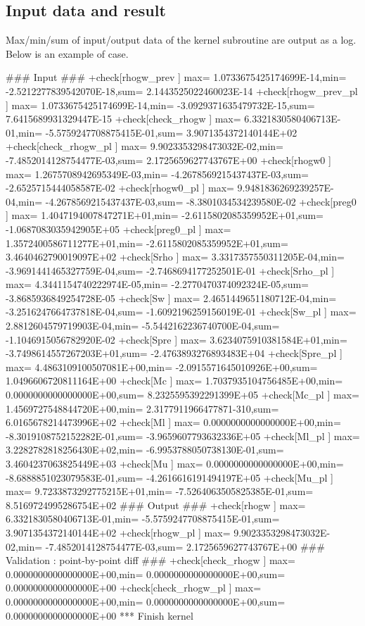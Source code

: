 \subsection{Input data and result}

Max/min/sum of input/output data of the kernel subroutine are output as
a log.
%
Below is an example of  case.


\begin{LstLog}
 ### Input ###
 +check[rhogw_prev      ] max=  1.0733675425174699E-14,min= -2.5212277839542070E-18,sum=  2.1443525022460023E-14
 +check[rhogw_prev_pl   ] max=  1.0733675425174699E-14,min= -3.0929371635479732E-15,sum=  7.6415689931329447E-15
 +check[check_rhogw     ] max=  6.3321830580406713E-01,min= -5.5759247708875415E-01,sum=  3.9071354372140144E+02
 +check[check_rhogw_pl  ] max=  9.9023353298473032E-02,min= -7.4852014128754477E-03,sum=  2.1725659627743767E+00
 +check[rhogw0          ] max=  1.2675708942695349E-03,min= -4.2678569215437437E-03,sum= -2.6525715444058587E-02
 +check[rhogw0_pl       ] max=  9.9481836269239257E-04,min= -4.2678569215437437E-03,sum= -8.3801034534239580E-02
 +check[preg0           ] max=  1.4047194007847271E+01,min= -2.6115802085359952E+01,sum= -1.0687083035942905E+05
 +check[preg0_pl        ] max=  1.3572400586711277E+01,min= -2.6115802085359952E+01,sum=  3.4640462790019097E+02
 +check[Srho            ] max=  3.3317357550311205E-04,min= -3.9691441465327759E-04,sum= -2.7468694177252501E-01
 +check[Srho_pl         ] max=  4.3441154740222974E-05,min= -2.2770470374092324E-05,sum= -3.8685936849254728E-05
 +check[Sw              ] max=  2.4651449651180712E-04,min= -3.2516247664737818E-04,sum= -1.6092196259156019E-01
 +check[Sw_pl           ] max=  2.8812604579719903E-04,min= -5.5442162236740700E-04,sum= -1.1046915056782920E-02
 +check[Spre            ] max=  3.6234075910381584E+01,min= -3.7498614557267203E+01,sum= -2.4763893276893483E+04
 +check[Spre_pl         ] max=  4.4863109100507081E+00,min= -2.0915571645010926E+00,sum=  1.0496606720811164E+00
 +check[Mc              ] max=  1.7037935104756485E+00,min=  0.0000000000000000E+00,sum=  8.2325595392291399E+05
 +check[Mc_pl           ] max=  1.4569727548844720E+00,min=  2.3177911966477871-310,sum=  6.0165678214473996E+02
 +check[Ml              ] max=  0.0000000000000000E+00,min= -8.3019108752152282E-01,sum= -3.9659607793632336E+05
 +check[Ml_pl           ] max=  3.2282782818256430E+02,min= -6.9953788050738130E-01,sum=  3.4604237063825449E+03
 +check[Mu              ] max=  0.0000000000000000E+00,min= -8.6888851023079583E-01,sum= -4.2616616191494197E+05
 +check[Mu_pl           ] max=  9.7233873292775215E+01,min= -7.5264063505825385E-01,sum=  8.5169724995286754E+02
 ### Output ###
 +check[rhogw           ] max=  6.3321830580406713E-01,min= -5.5759247708875415E-01,sum=  3.9071354372140144E+02
 +check[rhogw_pl        ] max=  9.9023353298473032E-02,min= -7.4852014128754477E-03,sum=  2.1725659627743767E+00
 ### Validation : point-by-point diff ###
 +check[check_rhogw     ] max=  0.0000000000000000E+00,min=  0.0000000000000000E+00,sum=  0.0000000000000000E+00
 +check[check_rhogw_pl  ] max=  0.0000000000000000E+00,min=  0.0000000000000000E+00,sum=  0.0000000000000000E+00
 *** Finish kernel
\end{LstLog}

